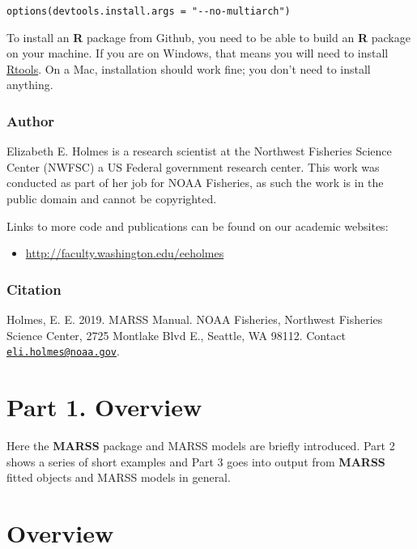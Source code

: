 \documentclass[12pt,]{book}
\providecommand{\tightlist}{%
  \setlength{\itemsep}{0pt}\setlength{\parskip}{0pt}}
\begin{document}
\begin{verbatim}
options(devtools.install.args = "--no-multiarch")
\end{verbatim}

To install an \textbf{R} package from Github, you need to be able to build an \textbf{R} package on your machine. If you are on Windows, that means you will need to install \href{https://cran.r-project.org/bin/windows/Rtools/}{Rtools}. On a Mac, installation should work fine; you don't need to install anything.

\hypertarget{author}{%
\subsection*{Author}\label{author}}


Elizabeth E. Holmes is a research scientist at the Northwest Fisheries Science Center (NWFSC) a US Federal government research center. This work was conducted as part of her job for NOAA Fisheries, as such the work is in the public domain and cannot be copyrighted.

Links to more code and publications can be found on our academic websites:

\begin{itemize}
\tightlist
\item
  \url{http://faculty.washington.edu/eeholmes}
\end{itemize}

\hypertarget{citation}{%
\subsection*{Citation}\label{citation}}


Holmes, E. E. 2019. MARSS Manual. NOAA Fisheries, Northwest Fisheries Science Center, 2725 Montlake Blvd E., Seattle, WA 98112. Contact \href{mailto:eli.holmes@noaa.gov}{\nolinkurl{eli.holmes@noaa.gov}}.

\hypertarget{part1}{%
\chapter*{Part 1. Overview}\label{part1}}


Here the \textbf{MARSS} package and MARSS models are briefly introduced. Part 2 shows a series of short examples and Part 3 goes into output from \textbf{MARSS} fitted objects and MARSS models in general.

\hypertarget{chap-overview}{%
\chapter{Overview}\label{chap-overview}}
\end{document}

